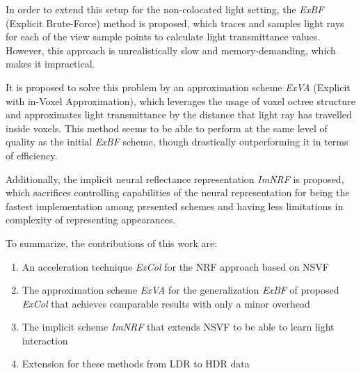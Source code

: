 In order to extend this setup for the non-colocated light setting, the \textit{ExBF} (Explicit Brute-Force) method is proposed,
which traces and samples light rays for each of the view sample points to calculate light transmittance values.
However, this approach is unrealistically slow and memory-demanding,
which makes it impractical.

It is proposed to solve this problem by an approximation scheme \textit{ExVA} (Explicit with in-Voxel Approximation),
which leverages the usage of voxel octree structure
and approximates light transmittance by the distance that light ray has travelled inside voxels.
This method seems to be able to perform at the same level of quality as the initial \textit{ExBF} scheme,
though drastically outperforming it in terms of efficiency.

Additionally, the implicit neural reflectance representation \textit{ImNRF} is proposed,
which sacrifices controlling capabilities of the neural representation
for being the fastest implementation among presented schemes
and having less limitations in complexity of representing appearances.


To summarize, the contributions of this work are:
\begin{enumerate}
    \item An acceleration technique \textit{ExCol} for the NRF approach
    based on NSVF
    \item The approximation scheme \textit{ExVA}
    for the generalization \textit{ExBF} of proposed \textit{ExCol}
    that achieves comparable results with only a minor overhead
    \item The implicit scheme \textit{ImNRF} that extends NSVF to be able to learn light interaction
    \item Extension for these methods from LDR to HDR data
\end{enumerate}











